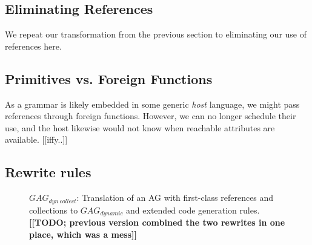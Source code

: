 \subsection{Eliminating References}
We repeat our transformation from the previous section to eliminating our use of references here.




\subsection{Primitives vs. Foreign Functions}

As a grammar is likely embedded in some generic \emph{host} language, we might pass references through foreign functions. However, we can no longer schedule their use, and the host likewise would not know when reachable attributes are available. [[iffy..]]


\subsection{Rewrite rules}


%
\begin{figure*}
\caption{$GAG_{dyn~collect}$: Translation of an AG with first-class references and collections to $GAG_{dynamic}$ and extended code generation rules. \textbf{[[TODO; previous version combined the two rewrites in one place, which was a mess]]} }
\label{fig:statrewrites}
\end{figure*}
